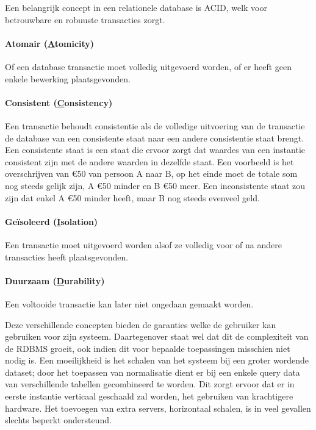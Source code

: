Een belangrijk concept in een relationele database is ACID, welk voor betrouwbare en robuuste transacties zorgt. 

\paragraph{Atomair (\underline{A}tomicity)} Of een database transactie moet volledig uitgevoerd worden, of er heeft geen enkele bewerking plaatsgevonden. 

\paragraph{Consistent (\underline{C}onsistency)} Een transactie behoudt consistentie als de volledige uitvoering van de transactie de database van een consistente staat naar een andere consistentie staat brengt. Een consistente staat is een staat die ervoor zorgt dat waardes van een instantie consistent zijn met de andere waarden in dezelfde staat. Een voorbeeld is het overschrijven van \euro{50} van persoon A naar B, op het einde moet de totale som nog steeds gelijk zijn, A \euro{50} minder en B \euro{50} meer. Een inconsistente staat zou zijn dat enkel A \euro{50} minder heeft, maar B nog steeds evenveel geld. 

\paragraph{Geïsoleerd (\underline{I}solation)} Een transactie moet uitgevoerd worden alsof ze volledig voor of na andere transacties heeft plaatsgevonden. 

\paragraph{Duurzaam (\underline{D}urability)} Een voltooide transactie kan later niet ongedaan gemaakt worden.

Deze verschillende concepten bieden de garanties welke de gebruiker kan gebruiken voor zijn systeem. Daartegenover staat wel dat dit de complexiteit van de RDBMS groeit, ook indien dit voor bepaalde toepassingen misschien niet nodig is. Een moeilijkheid is het schalen van het systeem bij een groter wordende dataset; door het toepassen van normalisatie dient er bij een enkele query data van verschillende tabellen gecombineerd te worden. Dit zorgt ervoor dat er in eerste instantie verticaal geschaald zal worden, het gebruiken van krachtigere hardware. Het toevoegen van extra servers, horizontaal schalen, is in veel gevallen slechts beperkt ondersteund. 


